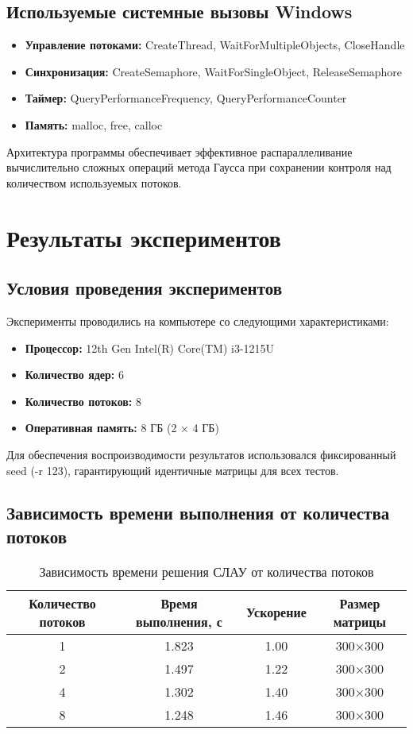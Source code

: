 \subsection{Используемые системные вызовы Windows}
\begin{itemize}
    \item \textbf{Управление потоками:} CreateThread, WaitForMultipleObjects, CloseHandle
    \item \textbf{Синхронизация:} CreateSemaphore, WaitForSingleObject, ReleaseSemaphore
    \item \textbf{Таймер:} QueryPerformanceFrequency, QueryPerformanceCounter
    \item \textbf{Память:} malloc, free, calloc
\end{itemize}

Архитектура программы обеспечивает эффективное распараллеливание вычислительно сложных операций метода Гаусса при сохранении контроля над количеством используемых потоков.

\section{Результаты экспериментов}

\subsection{Условия проведения экспериментов}

Эксперименты проводились на компьютере со следующими характеристиками:
\begin{itemize}
    \item \textbf{Процессор:} 12th Gen Intel(R) Core(TM) i3-1215U
    \item \textbf{Количество ядер:} 6
    \item \textbf{Количество потоков:} 8
    \item \textbf{Оперативная память:} 8 ГБ (2 × 4 ГБ)
\end{itemize}

Для обеспечения воспроизводимости результатов использовался фиксированный seed (-r 123), гарантирующий идентичные матрицы для всех тестов.

\subsection{Зависимость времени выполнения от количества потоков}

\begin{table}[h]
\centering
\begin{tabular}{|c|c|c|c|}
\hline
\textbf{Количество потоков} & \textbf{Время выполнения, с} & \textbf{Ускорение} & \textbf{Размер матрицы} \\
\hline
1 & 1.823 & 1.00 & 300×300 \\
2 & 1.497 & 1.22 & 300×300 \\
4 & 1.302 & 1.40 & 300×300 \\
8 & 1.248 & 1.46 & 300×300 \\
\hline
\end{tabular}
\caption{Зависимость времени решения СЛАУ от количества потоков}
\label{tab:threads_300}
\end{table}

